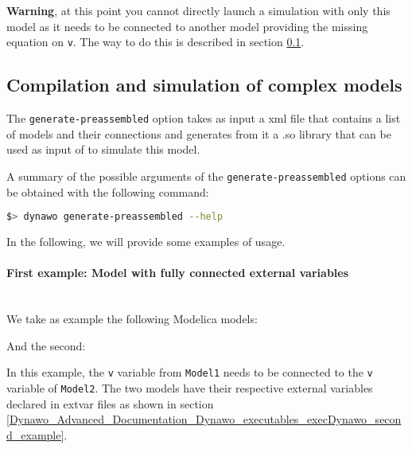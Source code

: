 \documentclass[a4paper, 12pt]{report}
\begin{document}
\textbf{Warning}, at this point you cannot directly launch a simulation with only this model as it needs to be connected to another model providing the missing equation on \lstinline[language=Modelica]{v}. The way to do this is described in section \ref{Dynawo_Advanced_Documentation_Dynawo_executables_Preassembled}.

\subsection{Compilation and simulation of complex models}
\label{Dynawo_Advanced_Documentation_Dynawo_executables_Preassembled}

The \lstinline[language=bash]{generate-preassembled} option takes as input a xml file that contains a list of models and their connections and generates from it a .so library that can be used as input of \Dynawo to simulate this model.

A summary of the possible arguments of the \lstinline[language=bash]{generate-preassembled} options can be obtained with the following command:

\begin{lstlisting}[language=bash,deletekeywords={jobs,help}]
$> dynawo generate-preassembled --help
\end{lstlisting}

In the following, we will provide some examples of usage.

\paragraph{First example: Model with fully connected external variables}
~~\\
We take as example the following Modelica models:


And the second:


In this example, the \lstinline[language=Modelica]{v} variable from
\lstinline[language=Modelica]{Model1} needs to be connected to the \lstinline[language=Modelica]{v} variable of \lstinline[language=Modelica]{Model2}.
The two models have their respective external variables declared in extvar files as shown in section \ref{Dynawo_Advanced_Documentation_Dynawo_executables_execDynawo_second_example}.\\
\end{document}
